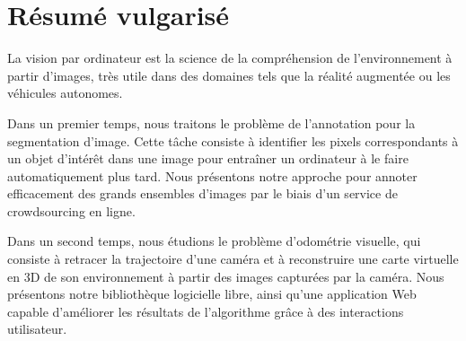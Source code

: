 \section*{Résumé vulgarisé}%
\label{sec:resume-vulgarise}

La vision par ordinateur est la science de la compréhension de l'environnement à partir d'images,
très utile dans des domaines tels que la réalité augmentée ou les véhicules autonomes.

Dans un premier temps, nous traitons le problème de l'annotation pour la segmentation d'image.
Cette tâche consiste à identifier les pixels correspondants
à un objet d'intérêt dans une image pour entraîner un ordinateur à
le faire automatiquement plus tard.
Nous présentons notre approche pour annoter efficacement des grands ensembles d'images
par le biais d'un service de crowdsourcing en ligne.

Dans un second temps, nous étudions le problème d'odométrie visuelle,
qui consiste à retracer la trajectoire d'une caméra et à reconstruire
une carte virtuelle en 3D de son environnement à partir des images capturées par la caméra.
Nous présentons notre bibliothèque logicielle libre, ainsi qu'une application Web capable
d'améliorer les résultats de l'algorithme grâce à des interactions utilisateur.
